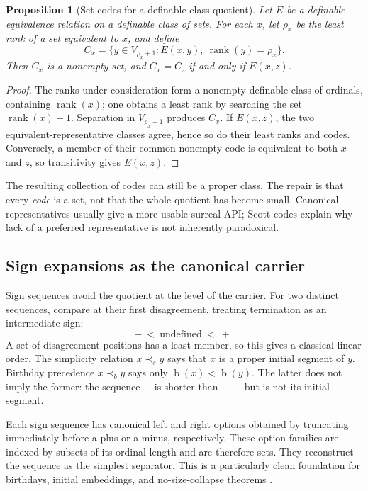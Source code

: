 \documentclass[11pt,letterpaper]{article}
\numberwithin{equation}{section}
\newtheorem{proposition}[theorem]{Proposition}
\theoremstyle{definition}
\theoremstyle{remark}
\newcommand{\rk}{\operatorname{rank}}
\newcommand{\bd}{\operatorname{b}}
\begin{document}
\begin{proposition}[Set codes for a definable class quotient]\label{prop:scott}
Let $E$ be a definable equivalence relation on a definable class of sets. For each $x$, let $\rho_x$ be the least rank of a set equivalent to $x$, and define
\[
C_x=\{y\in V_{\rho_x+1}:E(x,y),\ \rk(y)=\rho_x\}.
\]
Then $C_x$ is a nonempty set, and $C_x=C_z$ if and only if $E(x,z)$.
\end{proposition}
\begin{proof}
The ranks under consideration form a nonempty definable class of ordinals, containing $\rk(x)$; one obtains a least rank by searching the set $\rk(x)+1$. Separation in $V_{\rho_x+1}$ produces $C_x$. If $E(x,z)$, the two equivalent-representative classes agree, hence so do their least ranks and codes. Conversely, a member of their common nonempty code is equivalent to both $x$ and $z$, so transitivity gives $E(x,z)$.
\end{proof}
The resulting collection of codes can still be a proper class. The repair is that every \emph{code} is a set, not that the whole quotient has become small. Canonical representatives usually give a more usable surreal API; Scott codes explain why lack of a preferred representative is not inherently paradoxical.

\subsection{Sign expansions as the canonical carrier}
Sign sequences avoid the quotient at the level of the carrier. For two distinct sequences, compare at their first disagreement, treating termination as an intermediate sign:
\[
-\ <\ \text{undefined}\ <\ +.
\]
A set of disagreement positions has a least member, so this gives a classical linear order. The simplicity relation $x\prec_s y$ says that $x$ is a proper initial segment of $y$. Birthday precedence $x\prec_b y$ says only $\bd(x)<\bd(y)$. The latter does not imply the former: the sequence $+$ is shorter than $--$ but is not its initial segment.

Each sign sequence has canonical left and right options obtained by truncating immediately before a plus or a minus, respectively. These option families are indexed by subsets of its ordinal length and are therefore sets. They reconstruct the sequence as the simplest separator. This is a particularly clean foundation for birthdays, initial embeddings, and no-size-collapse theorems \cite{Gonshor,EhrlichHierarchy}.
\end{document}
